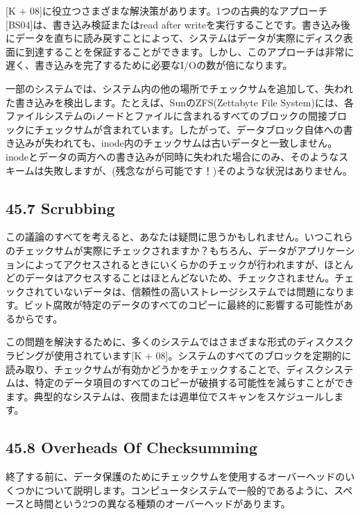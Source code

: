 {[}K +
08{]}に役立つさまざまな解決策があります。1つの古典的なアプローチ{[}BS04{]}は、書き込み検証またはread
after
writeを実行することです。書き込み後にデータを直ちに読み戻すことによって、システムはデータが実際にディスク表面に到達することを保証することができます。しかし、このアプローチは非常に遅く、書き込みを完了するために必要なI/Oの数が倍になります。

一部のシステムでは、システム内の他の場所でチェックサムを追加して、失われた書き込みを検出します。たとえば、SunのZFS(Zettabyte
File
System)には、各ファイルシステムのiノードとファイルに含まれるすべてのブロックの間接ブロックにチェックサムが含まれています。したがって、データブロック自体への書き込みが失われても、inode内のチェックサムは古いデータと一致しません。inodeとデータの両方への書き込みが同時に失われた場合にのみ、そのようなスキームは失敗しますが、(残念ながら可能です！)そのような状況はありません。

\hypertarget{scrubbing}{%
\subsection*{45.7 Scrubbing}\label{scrubbing}}

この議論のすべてを考えると、あなたは疑問に思うかもしれません。いつこれらのチェックサムが実際にチェックされますか？もちろん、データがアプリケーションによってアクセスされるときにいくらかのチェックが行われますが、ほとんどのデータはアクセスすることはほとんどないため、チェックされません。チェックされていないデータは、信頼性の高いストレージシステムでは問題になります。ビット腐敗が特定のデータのすべてのコピーに最終的に影響する可能性があるからです。

この問題を解決するために、多くのシステムではさまざまな形式のディスクスクラビングが使用されています{[}K
+
08{]}。システムのすべてのブロックを定期的に読み取り、チェックサムが有効かどうかをチェックすることで、ディスクシステムは、特定のデータ項目のすべてのコピーが破損する可能性を減らすことができます。典型的なシステムは、夜間または週単位でスキャンをスケジュールします。

\hypertarget{overheads-of-checksumming}{%
\subsection*{45.8 Overheads Of
Checksumming}\label{overheads-of-checksumming}}

終了する前に、データ保護のためにチェックサムを使用するオーバーヘッドのいくつかについて説明します。コンピュータシステムで一般的であるように、スペースと時間という2つの異なる種類のオーバーヘッドがあります。

